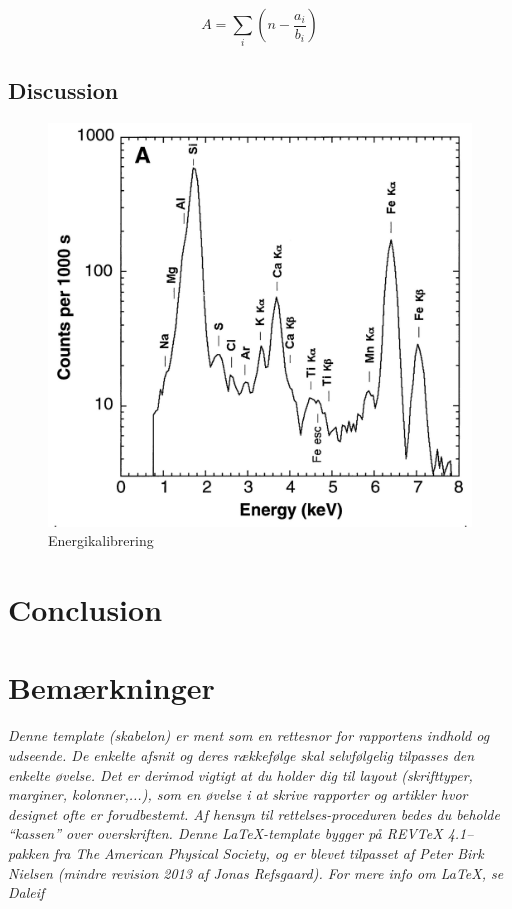 \documentclass[danish,a4paper,twocolumn,amsmath,amssymb,floatfix]{revtex4-1}
\begin{document}
\begin{equation}
	A = \sum_i (n - \frac{a_i}{b_i})
\end{equation}

\subsection*{Discussion}

\begin{figure}
	\centering
\includegraphics[width=0.9\columnwidth]{figure3.jpg}
\caption{Energikalibrering}
\label{fig:kalibrering}
\end{figure}

\section*{Conclusion}

\appendix
\section*{Bemærkninger}
\textsl{ Denne template (skabelon) er ment som en rettesnor for rapportens indhold og udseende. De enkelte afsnit og deres rækkefølge skal selvfølgelig tilpasses den enkelte øvelse. Det er derimod vigtigt at du holder dig til layout (skrifttyper, marginer, kolonner,...), som en øvelse i at skrive rapporter og artikler hvor designet ofte er forudbestemt. Af hensyn til rettelses-proceduren bedes du beholde \enquote{kassen} over overskriften. Denne \LaTeX-template bygger på REVTeX 4.1--pakken fra The American Physical Society, og er blevet tilpasset af Peter Birk Nielsen (mindre revision 2013 af Jonas Refsgaard). For mere info om \LaTeX{}, se Daleif \cite{Daleif}}
\end{document}
